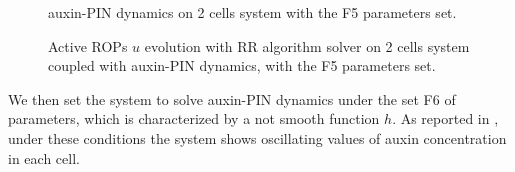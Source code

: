 \begin{figure}[H]
    \centering
    \quad
    \caption[auxin-PIN - with the F5 prm]{auxin-PIN dynamics on 2 cells system with the F5 parameters set.}
    \label{fig:Uaux_F5}
\end{figure}
\begin{figure}[H]
    \centering
    \quad
    \quad
    \quad
    \quad
    \quad
    \quad
    \caption[2cell RR Active ROPs coupled auxin-PIN - with the F5 set]{Active ROPs $u$ evolution with RR algorithm solver on 2 cells system coupled with auxin-PIN dynamics, with the F5 parameters set.}
    \label{fig:U_F5}
\end{figure}

We then set the system to solve auxin-PIN dynamics under the set F6 of parameters, which is characterized by a not smooth function $h$. As reported in \cite{plant:Farcot}, under these conditions the system shows oscillating values of auxin concentration in each cell.

